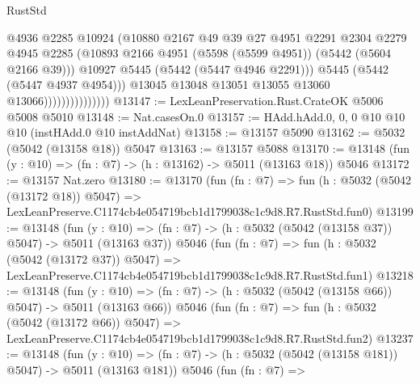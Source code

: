 \begin{lexlean}{RustStd}
\begin{coremodule}
                                    @4936
                                    @2285
                                    @10924
                                    (@10880
                                      @2167
                                      @49
                                      @39
                                      @27
                                      @4951
                                      @2291
                                      @2304
                                      @2279
                                      @4945
                                      @2285
                                      (@10893
                                        @2166
                                        @4951
                                        (@5598 (@5599 @4951))
                                        (@5442 (@5604 @2166 @39)))
                                      @10927
                                      @5445
                                      (@5442 (@5447 @4946 @2291)))
                                    @5445
                                    (@5442 (@5447 @4937 @4954)))
                                  @13045
                                  @13048
                                  @13051
                                  @13055
                                  @13060
                                  @13066)))))))))))))))
@13147 := LexLeanPreservation.Rust.CrateOK @5006 @5008 @5010
@13148 := Nat.casesOn.{0}
@13157 := HAdd.hAdd.{0, 0, 0} @10 @10 @10 (instHAdd.{0} @10 instAddNat)
@13158 := @13157 @5090
@13162 := @5032 (@5042 (@13158 @18)) @5047
@13163 := @13157 @5088
@13170 := @13148 (fun (y : @10) => (fn : @7) -> (h : @13162) -> @5011 (@13163 @18)) @5046
@13172 := @13157 Nat.zero
@13180 := @13170
    (fun (fn : @7) =>
    fun (h : @5032 (@5042 (@13172 @18)) @5047) =>
    LexLeanPreserve.C1174cb4e054719bcb1d1799038c1c9d8.R7.RustStd.fun0)
@13199 := @13148
    (fun (y : @10) => (fn : @7) -> (h : @5032 (@5042 (@13158 @37)) @5047) -> @5011 (@13163 @37))
    @5046
    (fun (fn : @7) =>
    fun (h : @5032 (@5042 (@13172 @37)) @5047) =>
    LexLeanPreserve.C1174cb4e054719bcb1d1799038c1c9d8.R7.RustStd.fun1)
@13218 := @13148
    (fun (y : @10) => (fn : @7) -> (h : @5032 (@5042 (@13158 @66)) @5047) -> @5011 (@13163 @66))
    @5046
    (fun (fn : @7) =>
    fun (h : @5032 (@5042 (@13172 @66)) @5047) =>
    LexLeanPreserve.C1174cb4e054719bcb1d1799038c1c9d8.R7.RustStd.fun2)
@13237 := @13148
    (fun (y : @10) => (fn : @7) -> (h : @5032 (@5042 (@13158 @181)) @5047) -> @5011 (@13163 @181))
    @5046
    (fun (fn : @7) =>

\end{coremodule}
\end{lexlean}
